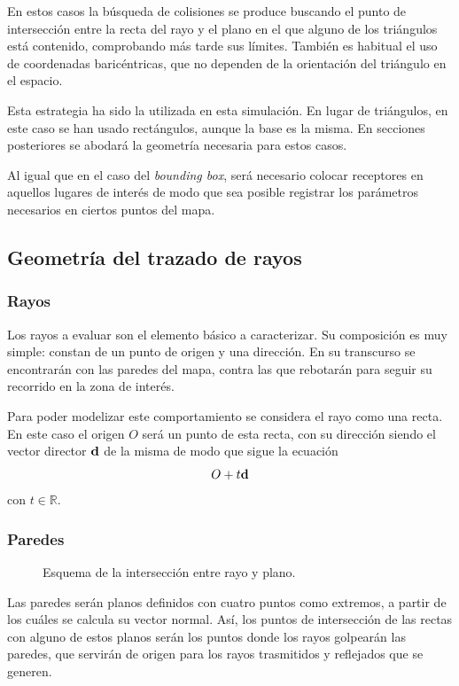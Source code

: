 En estos casos la búsqueda de colisiones se produce buscando el punto de intersección entre la recta del rayo y el plano en el que alguno de los triángulos está contenido, comprobando más tarde sus límites.
También es habitual el uso de coordenadas baricéntricas, que no dependen de la orientación del triángulo en el espacio. \cite{Graficos}

Esta estrategia ha sido la utilizada en esta simulación.
En lugar de triángulos, en este caso se han usado rectángulos, aunque la base es la misma.
En secciones posteriores se abodará la geometría necesaria para estos casos.

Al igual que en el caso del \textit{bounding box}, será necesario colocar receptores en aquellos lugares de interés de modo que sea posible registrar los parámetros necesarios en ciertos puntos del mapa.


\subsection{Geometría del trazado de rayos}

\subsubsection{Rayos}
Los rayos a evaluar son el elemento básico a caracterizar.
Su composición es muy simple: constan de un punto de origen y una dirección.
En su transcurso se encontrarán con las paredes del mapa, contra las que rebotarán para seguir su recorrido en la zona de interés.

Para poder modelizar este comportamiento se considera el rayo como una recta.
En este caso el origen $O$ será un punto de esta recta, con su dirección siendo el vector director $\vb{d}$ de la misma de modo que sigue la ecuación
\begin{equation}
    O + t\vb{d}
\end{equation}
con $t\in \mathbb{R}$.

\subsubsection{Paredes}
\label{sec:paredes}

\begin{figure}
    \centering
    \hspace*{0.5cm}
    \def\svgwidth{0.3\textwidth}
    
    \caption{Esquema de la intersección entre rayo y plano.}
    \label{fig:rayo_plano}
\end{figure}
Las paredes serán planos definidos con cuatro puntos como extremos, a partir de los cuáles se calcula su vector normal.
Así, los puntos de intersección de las rectas con alguno de estos planos serán los puntos donde los rayos golpearán las paredes, que servirán de origen para los rayos trasmitidos y reflejados que se generen.

